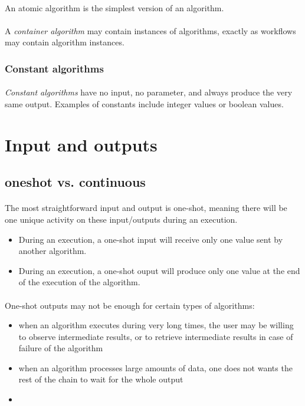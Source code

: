 \documentclass[a4paper,10pt]{book}
\begin{document}
\paragraph*{}
An atomic algorithm is the simplest version of an algorithm. 

\paragraph*{}
A \textit{container algorithm} may contain instances of algorithms, exactly as workflows may contain algorithm instances.
 

\subsubsection{Constant algorithms}

\paragraph*{}
\textit{Constant algorithms} have no input, no parameter, and always produce the very same output. Examples of constants include integer values or boolean values.

\section{Input and outputs}

\subsection{oneshot vs. continuous}

\paragraph*{}
The most straightforward input and output is one-shot, meaning there will be one unique activity on these input/outputs during an execution.
\begin{itemize}
\item During an execution, a one-shot input will receive only one value sent by another algorithm.
\item During an execution, a one-shot ouput will produce only one value at the end of the execution of the algorithm.
\end{itemize}

\paragraph*{}
One-shot outputs may not be enough for certain types of algorithms:
\begin{itemize}
\item when an algorithm executes during very long times, the user may be willing to observe intermediate results, or to retrieve intermediate results in case of failure of the algorithm
\item when an algorithm processes large amounts of data, one does not wants the rest of the chain to wait for the whole output
\item 
\end{itemize}
\end{document}

